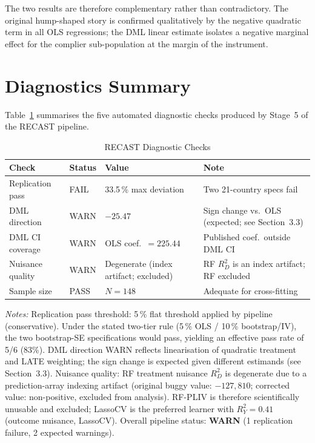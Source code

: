 \documentclass[12pt,letterpaper]{article}
\begin{document}
The two results are therefore complementary rather than contradictory.
The original hump-shaped story is confirmed qualitatively by the negative
quadratic term in all OLS regressions; the DML linear estimate isolates
a negative marginal effect for the complier sub-population at the margin
of the instrument.

\section{Diagnostics Summary}

Table~\ref{tab:diagnostics} summarises the five automated diagnostic checks
produced by Stage~5 of the RECAST pipeline.

\begin{table}[htbp]
\centering
\caption{RECAST Diagnostic Checks}
\label{tab:diagnostics}
\begin{tabular}{llll}
\toprule
Check & Status & Value & Note \\
\midrule
Replication pass    & FAIL & 33.5\,\% max deviation & Two 21-country specs fail \\
DML direction       & WARN & $-25.47$               & Sign change vs.\ OLS (expected; see Section~3.3) \\
DML CI coverage     & WARN & OLS coef.\ $= 225.44$  & Published coef.\ outside DML CI \\
Nuisance quality    & WARN & Degenerate (index artifact; excluded) & RF $R^2_D$ is an index artifact; RF excluded \\
Sample size         & PASS & $N = 148$              & Adequate for cross-fitting \\
\bottomrule
\end{tabular}
\begin{flushleft}
\footnotesize
\textit{Notes:}
Replication pass threshold: 5\,\% flat threshold applied by pipeline (conservative).
Under the stated two-tier rule (5\,\% OLS / 10\,\% bootstrap/IV), the two
bootstrap-SE specifications would pass, yielding an effective pass rate of 5/6 (83\%).
DML direction WARN reflects linearisation of quadratic treatment and LATE weighting;
the sign change is expected given different estimands (see Section~3.3).
Nuisance quality: RF treatment nuisance $R^2_D$ is degenerate due to a prediction-array
indexing artifact (original buggy value: $-127{,}810$; corrected value: non-positive,
excluded from analysis). RF-PLIV is therefore scientifically unusable and excluded;
LassoCV is the preferred learner with $R^2_Y = 0.41$ (outcome nuisance, LassoCV).
Overall pipeline status: \textbf{WARN} (1 replication failure, 2 expected warnings).
\end{flushleft}
\end{table}
\end{document}
